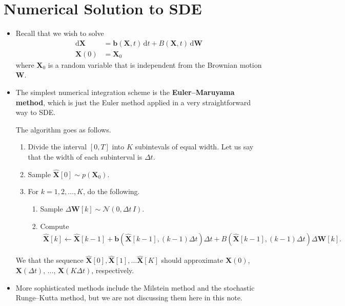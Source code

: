 \documentclass[10pt]{article}
\newcommand{\dee}{\mathrm{d}}
\newcommand{\ve}[1]{\mathbf{#1}}
\newcommand{\mcal}[1]{\mathcal{#1}}
\begin{document}
\section{Numerical Solution to SDE}
\begin{itemize}
  \item Recall that we wish to solve
  \begin{align*}
    \dee \ve{X} &= \ve{b}(\ve{X},t)\, \dee t + B(\ve{X},t)\, \dee \ve{W} \\
    \ve{X}(0) &= \ve{X}_0
  \end{align*}
  where $\ve{X}_0$ is a random variable that is independent from the Brownian motion $\ve{W}$.

  \item The simplest numerical integration scheme is the {\bf Euler--Maruyama method}, which is just the Euler method applied in a very straightforward way to SDE.
  
  The algorithm goes as follows.
  \begin{enumerate}
    \item Divide the interval $[0,T]$ into $K$ subintevals of equal width. Let us say that the width of each subinterval is $\Delta t$.
    
    \item Sample $\widehat{\ve{X}}[0] \sim p(\ve{X}_0)$.
    
    \item For $k = 1, 2, \dotsc, K$, do the following.
    \begin{enumerate}
      \item Sample $\Delta \ve{W}[k] \sim \mcal{N}(0,\Delta t\, I )$.
      
      \item Compute
      \begin{align*}
        \widehat{\ve{X}}[k]
        \gets
        \widehat{\ve{X}}[k-1] + \ve{b}(\widehat{\ve{X}}[k-1], (k-1)\Delta t) \Delta t + B(\widehat{\ve{X}}[k-1], (k-1)\Delta t) \Delta \ve{W}[k].
      \end{align*}
    \end{enumerate}
  \end{enumerate}
  We that the sequence $\widehat{\ve{X}}[0], \widehat{\ve{X}}[1], \dotsc \widehat{\ve{X}}[K]$ should approximate $\ve{X}(0)$, $\ve{X}(\Delta t)$, $\dotsc$, $\ve{X}(K \Delta t)$, respectively.
  
  \item More sophisticated methods include the Milstein method and the stochastic Runge--Kutta method, but we are not discussing them here in this note.
\end{itemize}
\end{document}
